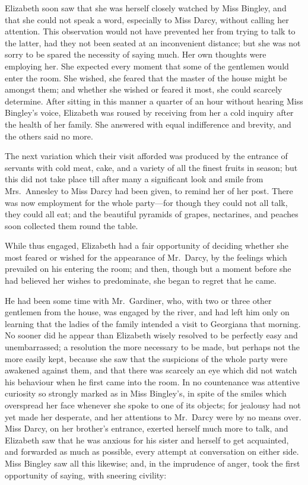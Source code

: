 \documentclass[12pt,english,oneside]{book}
\begin{document}
Elizabeth soon saw that she was herself closely watched by Miss Bingley,
and that she could not speak a word, especially to Miss Darcy, without
calling her attention. This observation would not have prevented her
from trying to talk to the latter, had they not been seated at an
inconvenient distance; but she was not sorry to be spared the necessity
of saying much. Her own thoughts were employing her. She expected
every moment that some of the gentlemen would enter the room. She
wished, she feared that the master of the house might be amongst them;
and whether she wished or feared it most, she could scarcely determine.
After sitting in this manner a quarter of an hour without hearing
Miss Bingley's voice, Elizabeth was roused by receiving from her a
cold inquiry after the health of her family. She answered with equal
indifference and brevity, and the others said no more.

The next variation which their visit afforded was produced by the
entrance of servants with cold meat, cake, and a variety of all the
finest fruits in season; but this did not take place till after many
a significant look and smile from Mrs.\ Annesley to Miss Darcy had
been given, to remind her of her post. There was now employment for
the whole party\mbox{---}for though they could not all talk, they
could all eat; and the beautiful pyramids of grapes, nectarines, and
peaches soon collected them round the table.

While thus engaged, Elizabeth had a fair opportunity of deciding whether
she most feared or wished for the appearance of Mr.\ Darcy, by the
feelings which prevailed on his entering the room; and then, though
but a moment before she had believed her wishes to predominate, she
began to regret that he came.

He had been some time with Mr.\ Gardiner, who, with two or three
other gentlemen from the house, was engaged by the river, and had
left him only on learning that the ladies of the family intended a
visit to Georgiana that morning. No sooner did he appear than Elizabeth
wisely resolved to be perfectly easy and unembarrassed; a resolution
the more necessary to be made, but perhaps not the more easily kept,
because she saw that the suspicions of the whole party were awakened
against them, and that there was scarcely an eye which did not watch
his behaviour when he first came into the room. In no countenance
was attentive curiosity so strongly marked as in Miss Bingley's, in
spite of the smiles which overspread her face whenever she spoke to
one of its objects; for jealousy had not yet made her desperate, and
her attentions to Mr.\ Darcy were by no means over. Miss Darcy, on
her brother's entrance, exerted herself much more to talk, and Elizabeth
saw that he was anxious for his sister and herself to get acquainted,
and forwarded as much as possible, every attempt at conversation on
either side. Miss Bingley saw all this likewise; and, in the imprudence
of anger, took the first opportunity of saying, with sneering civility:
\end{document}
